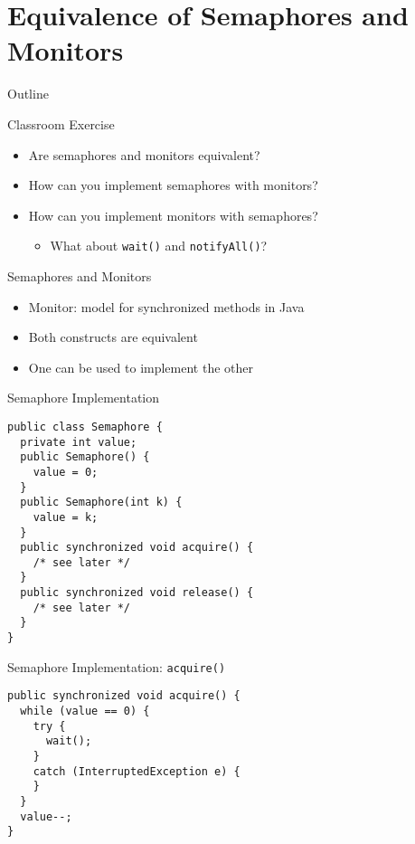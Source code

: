 \section{Equivalence of Semaphores and Monitors}

\begin{frame}{Outline}
  \tableofcontents[current]
\end{frame}

\begin{frame}{Classroom Exercise}
  \begin{itemize}
  \item Are semaphores and monitors equivalent?
  \item How can you implement semaphores with monitors?
  \item How can you implement monitors with semaphores?
    \begin{itemize}
    \item What about \lstinline!wait()! and \lstinline!notifyAll()!?
    \end{itemize}
  \end{itemize}
\end{frame}

\begin{frame}{Semaphores and Monitors}
  \begin{itemize}
  \item Monitor: model for synchronized methods in Java
  \item Both constructs are equivalent
  \item \alert{One can be used to implement the other}
  \end{itemize}
\end{frame}

\begin{frame}[fragile]{Semaphore Implementation}
\begin{lstlisting}
public class Semaphore {
  private int value;
  public Semaphore() { 
    value = 0; 
  }
  public Semaphore(int k) { 
    value = k; 
  }
  public synchronized void acquire() { 
    /* see later */ 
  }
  public synchronized void release() { 
    /* see later */ 
  }   
}
\end{lstlisting}
\end{frame}

\begin{frame}[fragile]{Semaphore Implementation: \lstinline!acquire()!}
\begin{lstlisting}
public synchronized void acquire() {
  while (value == 0) {
    try {
      wait();
    }
    catch (InterruptedException e) { 
    }
  }
  value--;
}
\end{lstlisting}
\end{frame}


